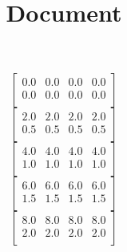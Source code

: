 \documentclass[]{article}
\title{Document}
\begin{document}
\[\begin{bmatrix}
0.0 & 0.0 & 0.0 & 0.0\\
0.0 & 0.0 & 0.0 & 0.0\\
\end{bmatrix}\]
\[\begin{bmatrix}
2.0 & 2.0 & 2.0 & 2.0\\
0.5 & 0.5 & 0.5 & 0.5\\
\end{bmatrix}\]
\[\begin{bmatrix}
4.0 & 4.0 & 4.0 & 4.0\\
1.0 & 1.0 & 1.0 & 1.0\\
\end{bmatrix}\]
\[\begin{bmatrix}
6.0 & 6.0 & 6.0 & 6.0\\
1.5 & 1.5 & 1.5 & 1.5\\
\end{bmatrix}\]
\[\begin{bmatrix}
8.0 & 8.0 & 8.0 & 8.0\\
2.0 & 2.0 & 2.0 & 2.0\\
\end{bmatrix}\]
\end{document}
